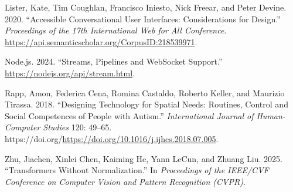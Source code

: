 \documentclass[
]{article}
\newlength{\cslhangindent}
\newenvironment{CSLReferences}[2] %
 {\begin{list}{}{%
  \setlength{\itemindent}{0pt}
  \setlength{\leftmargin}{0pt}
  \setlength{\parsep}{0pt}
  \ifodd #1
   \setlength{\leftmargin}{\cslhangindent}
   \setlength{\itemindent}{-1\cslhangindent}
  \fi
  \setlength{\itemsep}{#2\baselineskip}}}
 {\end{list}}
\begin{document}
\begin{CSLReferences}{1}{0}
Lister, Kate, Tim Coughlan, Francisco Iniesto, Nick Freear, and Peter
Devine. 2020. {``Accessible Conversational User Interfaces:
Considerations for Design.''} \emph{Proceedings of the 17th
International Web for All Conference}.
\url{https://api.semanticscholar.org/CorpusID:218539971}.

Node.js. 2024. {``Streams, Pipelines and WebSocket Support.''}
\url{https://nodejs.org/api/stream.html}.

Rapp, Amon, Federica Cena, Romina Castaldo, Roberto Keller, and Maurizio
Tirassa. 2018. {``Designing Technology for Spatial Needs: Routines,
Control and Social Competences of People with Autism.''}
\emph{International Journal of Human-Computer Studies} 120: 49--65.
https://doi.org/\url{https://doi.org/10.1016/j.ijhcs.2018.07.005}.

Zhu, Jiachen, Xinlei Chen, Kaiming He, Yann LeCun, and Zhuang Liu. 2025.
{``Transformers Without Normalization.''} In \emph{Proceedings of the
IEEE/CVF Conference on Computer Vision and Pattern Recognition (CVPR)}.

\end{CSLReferences}
\end{document}
